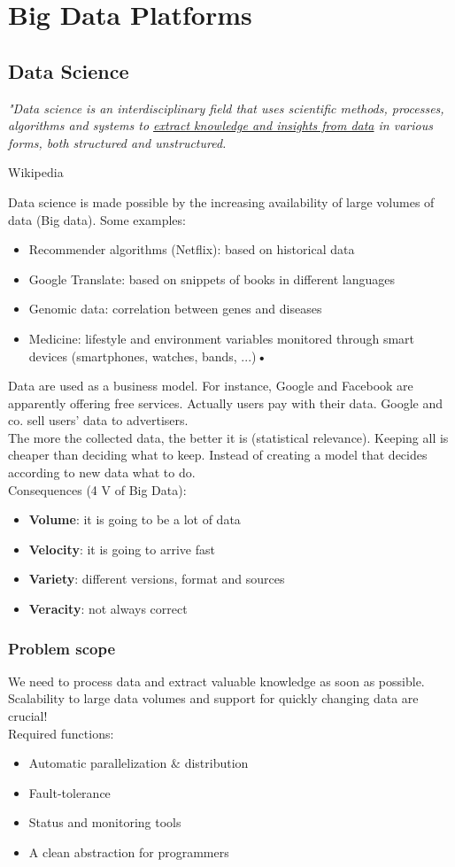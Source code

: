 \documentclass[10pt,a4paper]{article}
\begin{document}
\section{\LARGE Big Data Platforms}
\subsection{Data Science}
\textit{"Data science is an interdisciplinary field that uses scientific methods, processes, algorithms and systems to \underline{extract knowledge and insights from data} in various forms, both structured and unstructured.}
\begin{center}
Wikipedia
\end{center}
Data science is made possible by the increasing availability of large volumes of data (Big data). Some examples:
\begin{itemize}
	\item Recommender algorithms (Netflix): based on historical data
	\item Google Translate: based on snippets of books in different languages
	\item Genomic data: correlation between genes and diseases
	\item Medicine: lifestyle and environment variables monitored through smart devices (smartphones, watches, bands, ...)\textbf{•}
\end{itemize}
Data are used as a business model. For instance, Google and Facebook are apparently offering free services. Actually users pay with their data. Google and co. sell users' data to advertisers. \\
The more the collected data, the better it is (statistical relevance). Keeping all is cheaper than deciding what to keep. Instead of creating a model that decides according to new data what to do. \\
Consequences (4 V of Big Data):
\begin{itemize}
	\item \textbf{Volume}: it is going to be a lot of data
	\item \textbf{Velocity}: it is going to arrive fast
	\item \textbf{Variety}: different versions, format and sources
	\item \textbf{Veracity}: not always correct
\end{itemize}
\subsubsection{Problem scope}
We need to process data and extract valuable knowledge as soon as possible.
Scalability to large data volumes and support for quickly changing data are crucial! \\
Required functions:
\begin{itemize}
	\item Automatic parallelization $\&$ distribution
	\item Fault-tolerance
	\item Status and monitoring tools
	\item A clean abstraction for programmers
\end{itemize} \pagebreak
\end{document}
